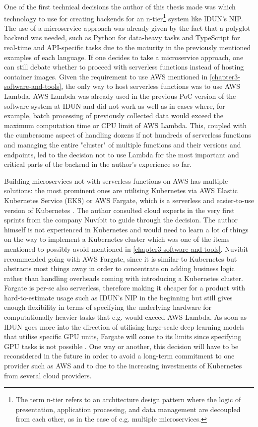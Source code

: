One of the first technical decisions the author of this thesis made was which technology to use for creating backends for an n-tier\footnote{The term n-tier refers to an architecture design pattern where the logic of presentation, application processing, and data management are decoupled from each other, as in the case of e.g. multiple microservices.} system like IDUN's NIP. The use of a microservice approach was already given by the fact that a polyglot backend was needed, such as Python for data-heavy tasks and TypeScript for real-time and API-specific tasks due to the maturity in the previously mentioned examples of each language. If one decides to take a microservice approach, one can still debate whether to proceed with serverless functions instead of hosting container images. Given the requirement to use AWS mentioned in \autoref{chapter3-software-and-tools}, the only way to host serverless functions was to use AWS Lambda. AWS Lambda was already used in the previous PoC version of the software system at IDUN and did not work as well as in cases where, for example, batch processing of previously collected data would exceed the maximum computation time or CPU limit of AWS Lambda. This, coupled with the cumbersome aspect of handling dozens if not hundreds of serverless functions and managing the entire "cluster" of multiple functions and their versions and endpoints, led to the decision not to use Lambda for the most important and critical parts of the backend in the author's experience so far.

Building microservices not with serverless functions on AWS has multiple solutions: the most prominent ones are utilising Kubernetes via AWS Elastic Kubernetes Service (EKS) or AWS Fargate, which is a serverless and easier-to-use version of Kubernetes \citep{aws_serverless_nodate}. The author consulted cloud experts in the very first sprints from the company Nuvibit to guide through the decision. The author himself is not experienced in Kubernetes and would need to learn a lot of things on the way to implement a Kubernetes cluster which was one of the items mentioned to possibly avoid mentioned in \autoref{chapter3-software-and-tools}. Nuvibit recommended going with AWS Fargate, since it is similar to Kubernetes but abstracts most things away in order to concentrate on adding business logic rather than handling overheads coming with introducing a Kubernetes cluster. Fargate is per-se also serverless, therefore making it cheaper for a product with hard-to-estimate usage such as IDUN's NIP in the beginning but still gives enough flexibility in terms of specifying the underlying hardware for computationally heavier tasks that e.g. would exceed AWS Lambda. As soon as IDUN goes more into the direction of utilising large-scale deep learning models that utilise specific GPU units, Fargate will come to its limits since specifying GPU tasks is not possible \citep{aws_aws_2019}. One way or another, this decision will have to be reconsidered in the future in order to avoid a long-term commitment to one provider such as AWS and to due to the increasing investments of Kubernetes from several cloud providers.

